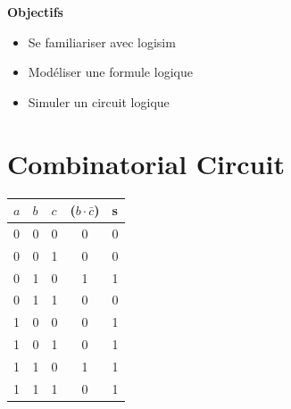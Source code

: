 \documentclass[10pt]{article} %
\begin{document}


% 
% 

\vspace{0.7cm}
{\noindent \Large \bf Objectifs}
\begin{itemize}
    \item [\ding{78}] Se familiariser avec logisim
    \item [\ding{78}] Modéliser une formule logique
    \item [\ding{78}] Simuler un circuit logique
\end{itemize}


\section{Combinatorial Circuit}

\begin{table}[h!]
    \hspace{2cm}
    \begin{minipage}{0.5\linewidth}
        \begin{tabular}{l | l |l | c |l}
            $a$ & $b$ & $c$ & ($b \cdot \bar c$) & s \\
            \hline
            0 & 0 & 0 & 0                                              & 0 \\
            0 & 0 & 1 & 0                                              & 0 \\
            0 & 1 & 0 & 1                                              & 1 \\
            0 & 1 & 1 & 0                                              & 0 \\
            1 & 0 & 0 & 0                                              & 1 \\
            1 & 0 & 1 & 0                                              & 1 \\
            1 & 1 & 0 & 1                                              & 1 \\
            1 & 1 & 1 & 0                                              & 1
        \end{tabular}
    \end{minipage}



\end{table}
\end{document}
